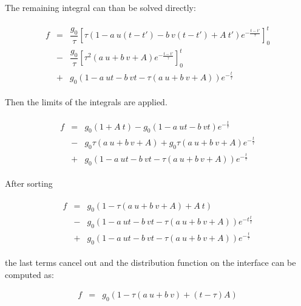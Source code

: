 \documentclass[
	pdftex,             %
	12pt,				%
	a4paper,		   	%
	english,				%
	oneside,			%
]{article}
\begin{document}
The remaining integral can than be solved directly:

\begin{equation}
\begin{split}
\begin{array}{lcll}
f
&=&
\dfrac{g_0}{\tau} 
\left[
	\tau
	\left( 1 - a~u(t-t') - b~v(t-t') + A~t' \right)e^{-\tfrac{t-t'}{\tau}}
\right]_0^t
\\
&-&
\dfrac{g_0}{\tau} 
\left[
	\tau^2
	\left( a~u + b~v + A\right) e^{-\tfrac{t-t'}{\tau}} 
\right]_0^t
\\
&+&
g_0 \left( 1 - a~ut - b~vt - \tau \left( a~u + b~v + A \right) \right) e^{-\tfrac{t}{\tau}}
\end{array}
\end{split}
\end{equation}

Then the limits of the integrals are applied.

\begin{equation}
\begin{split}
\begin{array}{lcll}
f
&=&
g_0 \left( 1 + A~t \right)
-
g_0 \left( 1 - a~ut - b~vt \right)e^{-\tfrac{t}{\tau}}
\\
&-&
g_0 \tau (a~u + b~v + A)
+
g_0 \tau (a~u + b~v + A) e^{-\tfrac{t}{\tau}}
\\
&+& g_0 \left( 1 - a~ut - b~vt - \tau \left( a~u + b~v + A \right) \right) e^{-\tfrac{t}{\tau}}
\end{array}
\end{split}
\end{equation}

After sorting

\begin{equation}
\begin{split}
\begin{array}{lcll}
f
&=&
g_0 \left( 1 - \tau (a~u + b~v + A) + A~t \right)
\\
&-&
g_0 \left( 1 - a~ut - b~vt - \tau(a~u + b~v + A) \right) e^{-t\tfrac{t}{\tau}}
\\
&+& 
g_0 \left( 1 - a~ut - b~vt - \tau \left( a~u + b~v + A \right) \right) e^{-\tfrac{t}{\tau}}
\end{array}
\end{split}
\end{equation}

the last terms cancel out and the distribution function on the interface can be computed as:

\begin{equation}
\begin{array}{lcl}
f &=& g_0 \left( 1 - \tau (a~u + b~v) + (t-\tau)A \right)
\end{array}
\end{equation}
\end{document}
